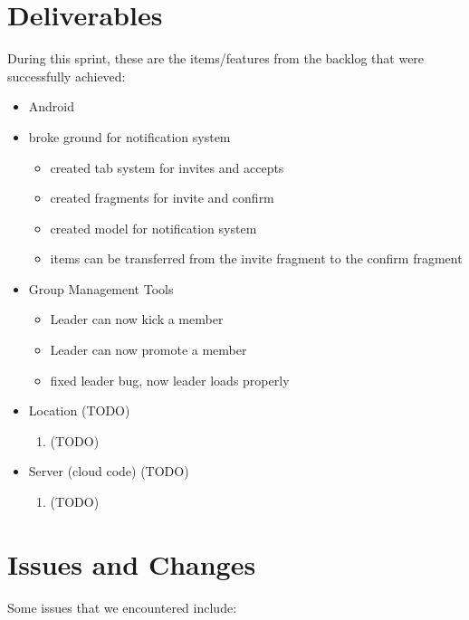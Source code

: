 \documentclass[11pt]{article}
\begin{document}
\section*{Deliverables}
During this sprint, these are the items/features from the backlog that were successfully achieved:
	\begin{itemize}
	\item Android
		\item broke ground for notification system
			\begin{itemize}
				\item created tab system for invites and accepts
				\item created fragments for invite and confirm
				\item created model for notification system
				\item items can be transferred from the invite fragment to the confirm fragment
			\end{itemize}
		\item Group Management Tools
			\begin{itemize}
				\item Leader can now kick a member
				\item Leader can now promote a member
				\item fixed leader bug, now leader loads properly
			\end{itemize}
		\item Location (TODO)
			\begin{enumerate}
				\item (TODO)
			\end{enumerate}
		
	\item Server (cloud code) (TODO)
		\begin{enumerate}
			\item (TODO)
		\end{enumerate}
	\end{itemize}

\section*{Issues and Changes}
Some issues that we encountered include:
\end{document}
